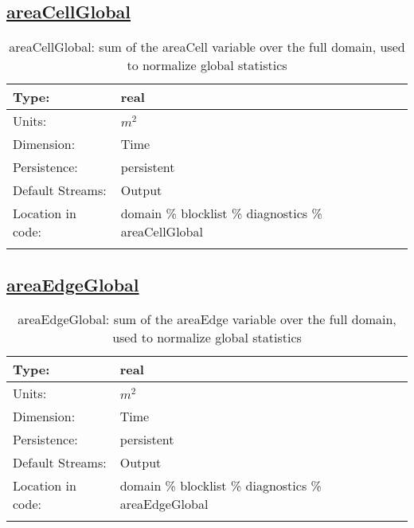 \subsection[areaCellGlobal]{\hyperref[sec:var_tab_diagnostics]{areaCellGlobal}}
\label{subsec:var_sec_diagnostics_areaCellGlobal}
\begin{center}
\begin{longtable}{| p{2.0in} | p{4.0in} |}
        \hline 
        Type: & real \\
        \hline 
        Units: & $m^2$ \\
        \hline 
        Dimension: & Time \\
        \hline 
        Persistence: & persistent \\
        \hline 
		 Default Streams: & Output  \\
        \hline 
		 Location in code: & domain \% blocklist \% diagnostics \% areaCellGlobal \\
		 \hline 
    \caption{areaCellGlobal: sum of the areaCell variable over the full domain, used to normalize global statistics}
\end{longtable}
\end{center}
\subsection[areaEdgeGlobal]{\hyperref[sec:var_tab_diagnostics]{areaEdgeGlobal}}
\label{subsec:var_sec_diagnostics_areaEdgeGlobal}
\begin{center}
\begin{longtable}{| p{2.0in} | p{4.0in} |}
        \hline 
        Type: & real \\
        \hline 
        Units: & $m^2$ \\
        \hline 
        Dimension: & Time \\
        \hline 
        Persistence: & persistent \\
        \hline 
		 Default Streams: & Output  \\
        \hline 
		 Location in code: & domain \% blocklist \% diagnostics \% areaEdgeGlobal \\
		 \hline 
    \caption{areaEdgeGlobal: sum of the areaEdge variable over the full domain, used to normalize global statistics}
\end{longtable}
\end{center}
